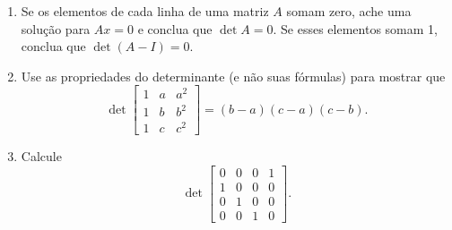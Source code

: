 \documentclass[leqno]{article}
\numberwithin{equation}{section}
\begin{document}
\begin{enumerate}
\begin{sol}

    
\end{sol}


\item Se os elementos de cada linha de uma matriz $A$ somam zero, ache uma solução para $Ax = 0$ e conclua que $\det A = 0$. Se esses elementos somam 1, conclua que $\det(A - I) = 0$.

\begin{sol}

    
\end{sol}


\item Use as propriedades do determinante (e não suas fórmulas) para mostrar que
$$\det \begin{bmatrix} 1 & a & a^2 \\ 1 & b & b^2 \\ 1 & c & c^2 \end{bmatrix} = (b-a)(c-a)(c-b).$$

\begin{sol}

    
\end{sol}


\item Calcule
$$\det \begin{bmatrix} 0 & 0 & 0 & 1 \\ 1 & 0 & 0 & 0 \\ 0 & 1 & 0 & 0 \\ 0 & 0 & 1 & 0  \end{bmatrix}.$$

\begin{sol}

    

\end{sol}
\end{enumerate}
\end{document}

